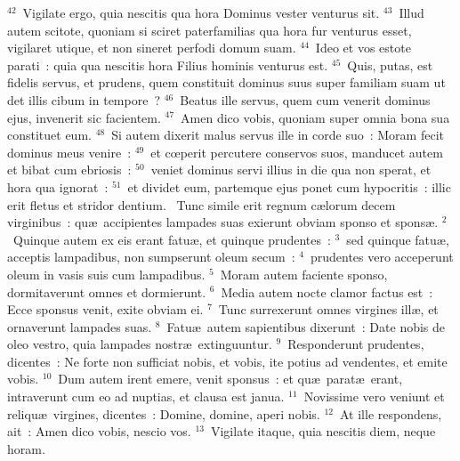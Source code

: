 ${}^{42}$~Vigilate ergo, quia nescitis qua hora Dominus vester venturus sit.
${}^{43}$~Illud autem scitote, quoniam si sciret paterfamilias qua hora fur venturus esset, vigilaret utique, et non sineret perfodi domum suam.
${}^{44}$~Ideo et vos estote parati~: quia qua nescitis hora Filius hominis venturus est.
${}^{45}$~Quis, putas, est fidelis servus, et prudens, quem constituit dominus suus super familiam suam ut det illis cibum in tempore~?
${}^{46}$~Beatus ille servus, quem cum venerit dominus ejus, invenerit sic facientem.
${}^{47}$~Amen dico vobis, quoniam super omnia bona sua constituet eum.
${}^{48}$~Si autem dixerit malus servus ille in corde suo~: Moram fecit dominus meus venire~:
${}^{49}$~et cœperit percutere conservos suos, manducet autem et bibat cum ebriosis~:
${}^{50}$~veniet dominus servi illius in die qua non sperat, et hora qua ignorat~:
${}^{51}$~et dividet eum, partemque ejus ponet cum hypocritis~: illic erit fletus et stridor dentium.
~Tunc simile erit regnum c\ae lorum decem virginibus~: qu\ae\ accipientes lampades suas exierunt obviam sponso et spons\ae .
${}^{2}$~Quinque autem ex eis erant fatu\ae , et quinque prudentes~:
${}^{3}$~sed quinque fatu\ae , acceptis lampadibus, non sumpserunt oleum secum~:
${}^{4}$~prudentes vero acceperunt oleum in vasis suis cum lampadibus.
${}^{5}$~Moram autem faciente sponso, dormitaverunt omnes et dormierunt.
${}^{6}$~Media autem nocte clamor factus est~: Ecce sponsus venit, exite obviam ei.
${}^{7}$~Tunc surrexerunt omnes virgines ill\ae , et ornaverunt lampades suas.
${}^{8}$~Fatu\ae\ autem sapientibus dixerunt~: Date nobis de oleo vestro, quia lampades nostr\ae\ extinguuntur.
${}^{9}$~Responderunt prudentes, dicentes~: Ne forte non sufficiat nobis, et vobis, ite potius ad vendentes, et emite vobis.
${}^{10}$~Dum autem irent emere, venit sponsus~: et qu\ae\ parat\ae\ erant, intraverunt cum eo ad nuptias, et clausa est janua.
${}^{11}$~Novissime vero veniunt et reliqu\ae\ virgines, dicentes~: Domine, domine, aperi nobis.
${}^{12}$~At ille respondens, ait~: Amen dico vobis, nescio vos.
${}^{13}$~Vigilate itaque, quia nescitis diem, neque horam.


